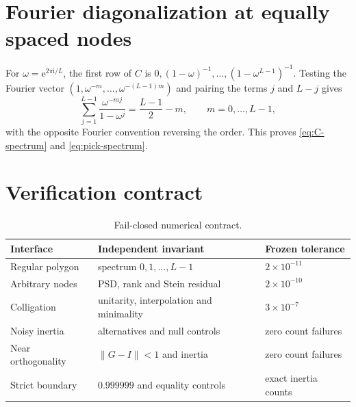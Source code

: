 \documentclass[11pt]{article}
\theoremstyle{definition}
\theoremstyle{remark}
\newcommand{\e}{\mathrm e}
\newcommand{\norm}[1]{\lVert#1\rVert}
\begin{document}
\section{Fourier diagonalization at equally spaced nodes}

For $\omega=\e^{2\pi\mathrm i/L}$, the first row of $C$ is
$0,(1-\omega)^{-1},\ldots,(1-\omega^{L-1})^{-1}$.  Testing the Fourier vector
$(1,\omega^{-m},\ldots,\omega^{-(L-1)m})$ and pairing the terms $j$ and
$L-j$ gives
\[
 \sum_{j=1}^{L-1}\frac{\omega^{-mj}}{1-\omega^j}
 =\frac{L-1}{2}-m,
 \qquad m=0,\ldots,L-1,
\]
with the opposite Fourier convention reversing the order.  This proves
\eqref{eq:C-spectrum} and \eqref{eq:pick-spectrum}.

\section{Verification contract}

\begin{table}[ht]
\centering
\small
\begin{tabular}{@{}lll@{}}
\toprule
Interface & Independent invariant & Frozen tolerance \\
\midrule
Regular polygon & spectrum $0,1,\ldots,L-1$ & $2\times10^{-11}$ \\
Arbitrary nodes & PSD, rank and Stein residual & $2\times10^{-10}$ \\
Colligation & unitarity, interpolation and minimality & $3\times10^{-7}$ \\
Noisy inertia & alternatives and null controls & zero count failures \\
Near orthogonality & $\norm{G-I}<1$ and inertia & zero count failures \\
Strict boundary & $0.999999$ and equality controls & exact inertia counts \\
\bottomrule
\end{tabular}
\caption{Fail-closed numerical contract.}
\label{tab:verification}
\end{table}



\end{document}
